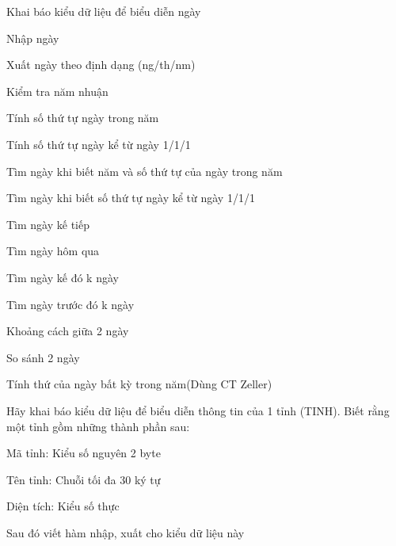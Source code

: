 \begin{problem}
    Khai báo kiểu dữ liệu để biểu diễn ngày
\end{problem}
\begin{problem}
    Nhập ngày
\end{problem}
\begin{problem}
    Xuất ngày theo định dạng (ng/th/nm)
\end{problem}
\begin{problem}
    Kiểm tra năm nhuận
\end{problem}
\begin{problem}
    Tính số thứ tự ngày trong năm
\end{problem}
\begin{problem}
    Tính số thứ tự ngày kể từ ngày 1/1/1
\end{problem}
\begin{problem}
    Tìm ngày khi biết năm và số thứ tự của ngày trong năm
\end{problem}
\begin{problem}
    Tìm ngày khi biết số thứ tự ngày kể từ ngày 1/1/1
\end{problem}
\begin{problem}
    Tìm ngày kế tiếp
\end{problem}
\begin{problem}
    Tìm ngày hôm qua
\end{problem}
\begin{problem}
    Tìm ngày kế đó k ngày
\end{problem}
\begin{problem}
    Tìm ngày trước đó k ngày
\end{problem}
\begin{problem}
    Khoảng cách giữa 2 ngày
\end{problem}
\begin{problem}
    So sánh 2 ngày

    Tính thứ của ngày bất kỳ trong năm(Dùng CT Zeller)
\end{problem}
\begin{problem}
    Hãy khai báo kiểu dữ liệu để biểu diễn thông tin của 1 tỉnh (TINH). Biết rằng một tỉnh gồm những thành phần sau:

Mã tỉnh: Kiểu số nguyên 2 byte

Tên tỉnh: Chuỗi tối đa 30 ký tự

Diện tích: Kiểu số thực

Sau đó viết hàm nhập, xuất cho kiểu dữ liệu này
\end{problem}
